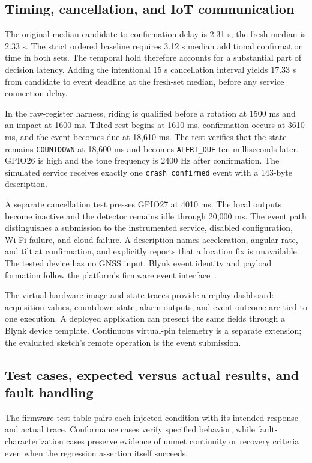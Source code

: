 \documentclass[10pt,a4paper]{article}
\begin{document}
\subsection{Timing, cancellation, and IoT communication}
The original median candidate-to-confirmation delay is 2.31 s; the fresh median is 2.33 s. The strict ordered baseline requires 3.12 s median additional confirmation time in both sets. The temporal hold therefore accounts for a substantial part of decision latency. Adding the intentional 15 s cancellation interval yields 17.33 s from candidate to event deadline at the fresh-set median, before any service connection delay.

In the raw-register harness, riding is qualified before a rotation at 1500 ms and an impact at 1600 ms. Tilted rest begins at 1610 ms, confirmation occurs at 3610 ms, and the event becomes due at 18,610 ms. The test verifies that the state remains \texttt{COUNTDOWN} at 18,600 ms and becomes \texttt{ALERT\_DUE} ten milliseconds later. GPIO26 is high and the tone frequency is 2400 Hz after confirmation. The simulated service receives exactly one \texttt{crash\_confirmed} event with a 143-byte description.

A separate cancellation test presses GPIO27 at 4010 ms. The local outputs become inactive and the detector remains idle through 20,000 ms. The event path distinguishes a submission to the instrumented service, disabled configuration, Wi-Fi failure, and cloud failure. A description names acceleration, angular rate, and tilt at confirmation, and explicitly reports that a location fix is unavailable. The tested device has no GNSS input. Blynk event identity and payload formation follow the platform's firmware event interface~\cite{blynkevents}.

The virtual-hardware image and state traces provide a replay dashboard: acquisition values, countdown state, alarm outputs, and event outcome are tied to one execution. A deployed application can present the same fields through a Blynk device template. Continuous virtual-pin telemetry is a separate extension; the evaluated sketch's remote operation is the event submission.

\subsection{Test cases, expected versus actual results, and fault handling}
\small
The firmware test table pairs each injected condition with its intended response and actual trace. Conformance cases verify specified behavior, while fault-characterization cases preserve evidence of unmet continuity or recovery criteria even when the regression assertion itself succeeds.
\end{document}

